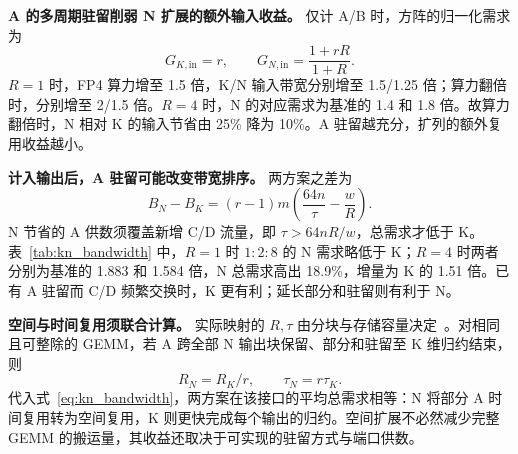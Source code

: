 \textbf{A 的多周期驻留削弱 N 扩展的额外输入收益。} 仅计 A/B 时，方阵的归一化需求为
\begin{equation}
G_{K,\mathrm{in}}=r,\qquad
G_{N,\mathrm{in}}=\frac{1+rR}{1+R}.
\label{eq:kn_input_reuse}
\end{equation}
$R=1$ 时，FP4 算力增至 1.5 倍，K/N 输入带宽分别增至 1.5/1.25 倍；算力翻倍时，分别增至 2/1.5 倍。$R=4$ 时，N 的对应需求为基准的 1.4 和 1.8 倍。故算力翻倍时，N 相对 K 的输入节省由 25\% 降为 10\%。A 驻留越充分，扩列的额外复用收益越小。

\textbf{计入输出后，A 驻留可能改变带宽排序。} 两方案之差为
\begin{equation}
B_N-B_K=(r-1)m\left(\frac{64n}{\tau}-\frac{w}{R}\right).
\label{eq:kn_bandwidth_difference}
\end{equation}
N 节省的 A 供数须覆盖新增 C/D 流量，即 $\tau>64nR/w$，总需求才低于 K。表~\ref{tab:kn_bandwidth} 中，$R=1$ 时 $1:2:8$ 的 N 需求略低于 K；$R=4$ 时两者分别为基准的 1.883 和 1.584 倍，N 总需求高出 18.9\%，增量为 K 的 1.51 倍。已有 A 驻留而 C/D 频繁交换时，K 更有利；延长部分和驻留则有利于 N。

\textbf{空间与时间复用须联合计算。} 实际映射的 $R,\tau$ 由分块与存储容量决定~\cite{timeloop2019}。对相同且可整除的 GEMM，若 A 跨全部 N 输出块保留、部分和驻留至 K 维归约结束，则
\begin{equation}
R_N=R_K/r,\qquad \tau_N=r\tau_K.
\label{eq:kn_same_gemm_reuse}
\end{equation}
代入式~\eqref{eq:kn_bandwidth}，两方案在该接口的平均总需求相等：N 将部分 A 时间复用转为空间复用，K 则更快完成每个输出的归约。空间扩展不必然减少完整 GEMM 的搬运量，其收益还取决于可实现的驻留方式与端口供数。
